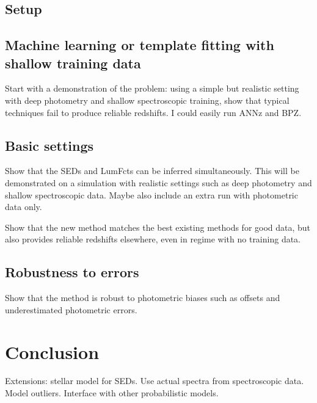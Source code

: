\documentclass[aps,prd,showpacs,superscriptaddress,groupedaddress]{revtex4}  %
\begin{document}
\subsection{Setup}

\subsection{Machine learning or template fitting with shallow training data}

Start with a demonstration of the problem: using a simple but realistic setting with deep photometry and shallow spectroscopic training, show that typical techniques fail to produce reliable redshifts. I could easily run ANNz and BPZ.


\subsection{Basic settings}

Show that the SEDs and LumFcts can be inferred simultaneously. This will be demonstrated on a simulation with realistic settings such as deep photometry and shallow spectroscopic data. Maybe also include an extra run with photometric data only. 

Show that the new method matches the best existing methods for good data, but also provides reliable redshifts elsewhere, even in regime with no training data. 

\subsection{Robustness to errors}

Show that the method is robust to photometric biases such as offsets and underestimated photometric errors. 



\section{Conclusion}
Extensions: stellar model for SEDs. Use actual spectra from spectroscopic data. Model outliers. Interface with other probabilistic models.


\footnotesize{
  
\providecommand{\eprint}[1]{\href{http://arxiv.org/abs/#1}{arXiv:#1}}	
  
}
\normalsize
\end{document}
